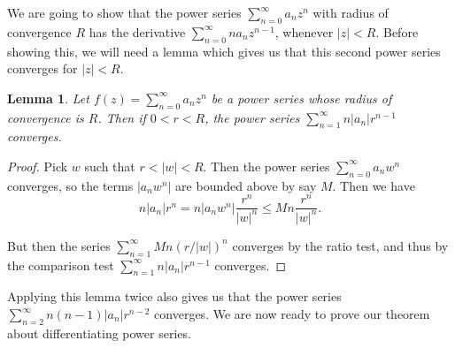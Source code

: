 \documentclass[11pt, a4paper]{article}
\newtheorem{lemma}[theorem]{Lemma}
\theoremstyle{definition}
\begin{document}
We are going to show that the power series $\sum_{n = 0}^{\infty} a_n z^n$ with radius of convergence $R$ has the derivative $\sum_{n = 0}^{\infty} n a_n z^{n - 1}$, whenever $|z| < R$.
Before showing this, we will need a lemma which gives us that this second power series converges for $|z| < R$.


\begin{lemma}
	Let $f(z) = \sum_{n = 0}^{\infty} a_n z^n$ be a power series whose radius of convergence is $R$. 
	Then if $0 < r < R$, the power series $\sum_{n = 1}^{\infty} n |a_n|r^{n - 1}$ converges.
\end{lemma}
\begin{proof}
	Pick $w$ such that $r < |w| < R$. Then the power series $\sum_{n = 0}^{\infty} a_n w^n$ converges, so the terms $|a_n w^n|$ are bounded above by say $M$. Then we have
	$$
	n|a_n|r^n = n|a_n w^n| \frac{r^n}{|w|^n} \leq M n \frac{r^n}{|w|^n}.
	$$

	But then the series $\sum_{n = 1}^{\infty} Mn (r/|w|)^n$ converges by the ratio test, and thus by the comparison test $\sum_{n = 1}^{\infty} n |a_n| r^{n - 1}$ converges.
\end{proof}

Applying this lemma twice also gives us that the power series
$
\sum_{n = 2}^{\infty} n(n - 1) |a_n| r^{n - 2}
$
converges. We are now ready to prove our theorem about differentiating power series.
\end{document}
